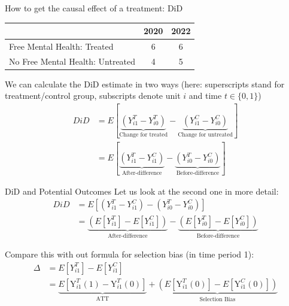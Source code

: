 \documentclass[11pt]{beamer}
\begin{document}
\begin{frame}{How to get the causal effect of a treatment: DiD}


\begin{table}[]
\begin{tabular}{lcc}
\toprule
\textbf{}                        & \textbf{2020} & \textbf{2022} \\ \midrule
Free Mental Health: Treated      &    6       & 6          \\ \midrule
No Free Mental Health: Untreated &    4       & 5        \\ \bottomrule
\end{tabular}
\end{table}

We can calculate the DiD estimate in two ways (here: superscripts stand for treatment/control group, subscripts denote unit $i$ and time $t\in\{0,1\}$)
\begin{align*}
DiD &=E[\underbrace{\left(Y_{i 1}^T-Y_{i 0}^T\right)}_{\text{Change for treated}}-\underbrace{\left(Y_{i 1}^C-Y_{i 0}^C\right)}_{\text{Change for untreated}}]  \\
 &=E[\underbrace{\left(Y_{i 1}^T-Y_{i 1}^C\right)}_{\text{After-difference}}-\underbrace{\left(Y_{i 0}^T-Y_{i 0}^C\right)}_{\text{Before-difference}}] 
\end{align*}


\end{frame}






\begin{frame}{DiD and Potential Outcomes}
Let us look at the second one in more detail:
$$
\begin{aligned}
DiD &=E[\left(Y_{i 1}^T-Y_{i 1}^C\right)-\left(Y_{i 0}^T-Y_{i 0}^C\right)] \\
&= \underbrace{\left(E[Y_{i 1}^T]-E[Y_{i 1}^C]\right)}_{\text{After-difference}}-\underbrace{\left(E[Y_{i 0}^T]-E[Y_{i 0}^C]\right)}_{\text{Before-difference}} 
\end{aligned}
$$

Compare this with out formula for selection bias (in time period 1):
$$
\begin{aligned}
\Delta &= E[Y_{i1}^T]-E[Y_{i1}^C] \\ 
&= \underbrace{E[\text{Y}^T_{i1}(1) - \text{Y}^T_{i1}(0)]}_{\text{ATT}} + \underbrace{\left(  E[\text{Y}^T_{i1}(0)] - E[\text{Y}^C_{i1}(0)] \right)}_{\text{Selection Bias}}
\end{aligned}
$$

\end{frame}
\end{document}
